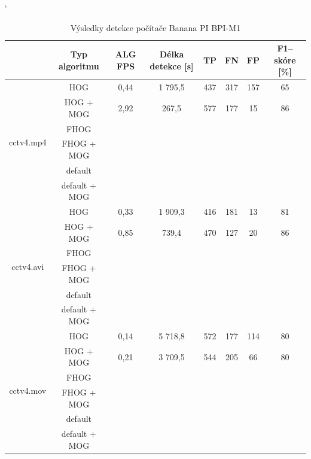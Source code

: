 \begin{table}[H]
\catcode`
\centering
\caption{Výsledky detekce počítače Banana PI BPI-M1}
\label{resultTabBPI}
\begin{tabular}{|c|c|c|c|c|c|c|c|}
\hline
                         & Typ algoritmu	& ALG FPS & Délka detekce [s] & TP 	  & FN 	& FP 	& F1--skóre [\%] \\ \hline
\multirow{6}{*}{cctv4.mp4} & HOG      		&  0,44   &   1 795,5    	  & 437   & 317 & 157  	&   65     		\\ \cline{2-8} 
                         & HOG + MOG  		&  2,92   &     267,5     	  & 577   & 177 & 15  	&   86     		\\ \cline{2-8} 
                         & FHOG       		&         &               	  &    &    &    &          \\ \cline{2-8} 
                         & FHOG + MOG 		&         &               	  &    &    &    &          \\ \cline{2-8}  
                         & default	 		&         &               	  &    &    &    &          \\ \cline{2-8}  
                         & default + MOG 	&         &               	  &    &    &    &          \\ \hline\hline 
\multirow{6}{*}{cctv4.avi} & HOG        	&  0,33   &   1 909,3     	  & 416	  & 181  & 13   &   81     		\\ \cline{2-8} 
                         & HOG + MOG  		&  0,85   &     739,4      	  & 470   & 127  & 20   &   86          \\ \cline{2-8} 
                         & FHOG       		&         &               	  &    &    &    &          \\ \cline{2-8} 
                         & FHOG + MOG 		&         &               	  &    &    &    &          \\ \cline{2-8} 
                         & default	 		&         &               	  &    &    &    &          \\ \cline{2-8} 
                         & default + MOG 	&         &               	  &    &    &    &          \\ \hline \hline
\multirow{6}{*}{cctv4.mov} & HOG        	&  0,14   &   5 718,8     	  & 572	  & 177  & 114  &   80		    \\ \cline{2-8} 
                         & HOG + MOG  		&  0,21   &   3 709,5      	  & 544   & 205  & 66   &   80          \\ \cline{2-8} 
                         & FHOG       		&         &               	  &    &    &    &          \\ \cline{2-8} 
                         & FHOG + MOG 		&         &               	  &    &    &    &          \\ \cline{2-8} 
                         & default	 		&         &               	  &    &    &    &          \\ \cline{2-8} 
                         & default + MOG 	&         &               	  &    &    &    &          \\ \hline
\end{tabular}
\end{table}

